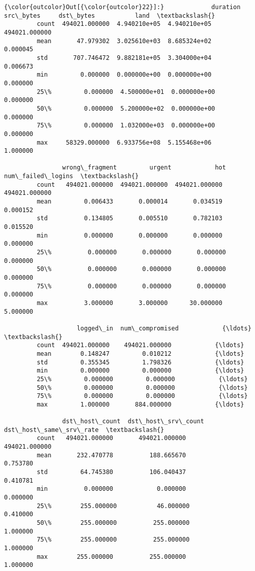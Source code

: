 \documentclass[11pt]{article}
\begin{document}
\begin{Verbatim}[commandchars=\\\{\}]
{\color{outcolor}Out[{\color{outcolor}22}]:}             duration     src\_bytes     dst\_bytes           land  \textbackslash{}
         count  494021.000000  4.940210e+05  4.940210e+05  494021.000000   
         mean       47.979302  3.025610e+03  8.685324e+02       0.000045   
         std       707.746472  9.882181e+05  3.304000e+04       0.006673   
         min         0.000000  0.000000e+00  0.000000e+00       0.000000   
         25\%         0.000000  4.500000e+01  0.000000e+00       0.000000   
         50\%         0.000000  5.200000e+02  0.000000e+00       0.000000   
         75\%         0.000000  1.032000e+03  0.000000e+00       0.000000   
         max     58329.000000  6.933756e+08  5.155468e+06       1.000000   
         
                wrong\_fragment         urgent            hot  num\_failed\_logins  \textbackslash{}
         count   494021.000000  494021.000000  494021.000000      494021.000000   
         mean         0.006433       0.000014       0.034519           0.000152   
         std          0.134805       0.005510       0.782103           0.015520   
         min          0.000000       0.000000       0.000000           0.000000   
         25\%          0.000000       0.000000       0.000000           0.000000   
         50\%          0.000000       0.000000       0.000000           0.000000   
         75\%          0.000000       0.000000       0.000000           0.000000   
         max          3.000000       3.000000      30.000000           5.000000   
         
                    logged\_in  num\_compromised            {\ldots}             \textbackslash{}
         count  494021.000000    494021.000000            {\ldots}              
         mean        0.148247         0.010212            {\ldots}              
         std         0.355345         1.798326            {\ldots}              
         min         0.000000         0.000000            {\ldots}              
         25\%         0.000000         0.000000            {\ldots}              
         50\%         0.000000         0.000000            {\ldots}              
         75\%         0.000000         0.000000            {\ldots}              
         max         1.000000       884.000000            {\ldots}              
         
                dst\_host\_count  dst\_host\_srv\_count  dst\_host\_same\_srv\_rate  \textbackslash{}
         count   494021.000000       494021.000000           494021.000000   
         mean       232.470778          188.665670                0.753780   
         std         64.745380          106.040437                0.410781   
         min          0.000000            0.000000                0.000000   
         25\%        255.000000           46.000000                0.410000   
         50\%        255.000000          255.000000                1.000000   
         75\%        255.000000          255.000000                1.000000   
         max        255.000000          255.000000                1.000000   
         

\end{Verbatim}
\end{document}
